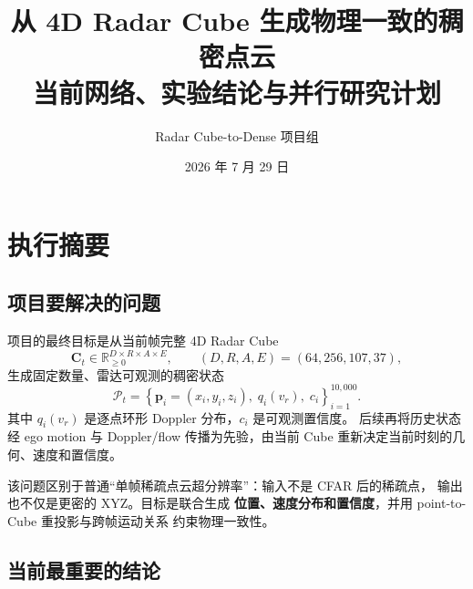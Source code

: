 \documentclass[11pt,a4paper,fontset=none]{ctexart}
\title{\bfseries 从 4D Radar Cube 生成物理一致的稠密点云\\[0.45em]
\large 当前网络、实验结论与并行研究计划}
\author{Radar Cube-to-Dense 项目组}
\date{2026 年 7 月 29 日}
\begin{document}
\maketitle

\begin{center}
\end{center}

\tableofcontents
\newpage

\section{执行摘要}

\subsection{项目要解决的问题}

项目的最终目标是从当前帧完整 4D Radar Cube
\begin{equation}
  \mathbf C_t\in\mathbb R_{\ge 0}^{D\times R\times A\times E},
  \qquad (D,R,A,E)=(64,256,107,37),
\end{equation}
生成固定数量、雷达可观测的稠密状态
\begin{equation}
  \mathcal P_t=
  \left\{\mathbf p_i=(x_i,y_i,z_i),\;
  q_i(v_r),\;c_i\right\}_{i=1}^{10{,}000}.
\end{equation}
其中 $q_i(v_r)$ 是逐点环形 Doppler 分布，$c_i$ 是可观测置信度。
后续再将历史状态经 ego motion 与 Doppler/flow 传播为先验，由当前 Cube
重新决定当前时刻的几何、速度和置信度。

该问题区别于普通“单帧稀疏点云超分辨率”：输入不是 CFAR 后的稀疏点，
输出也不仅是更密的 XYZ。目标是联合生成
\textbf{位置、速度分布和置信度}，并用 point-to-Cube 重投影与跨帧运动关系
约束物理一致性。

\subsection{当前最重要的结论}
\end{document}
